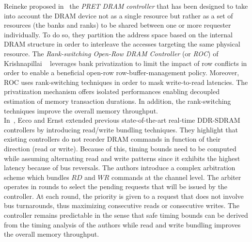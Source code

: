 \documentclass[main.tex]{subfiles}
\begin{document}
Reineke \etal proposed in~\cite{Reineke2011} the \emph{PRET DRAM controller} that has been designed to take into account the DRAM device not as a single resource but rather as a set of resources (the banks and ranks) to be shared between one or more requester individually. To do so, they partition the address space based on the internal DRAM structure in order to interleave the accesses targeting the same physical resource.
The \emph{Rank-switching Open-Row DRAM Controller} (or \emph{ROC}) of Krishnapillai \etal~\cite{Krishnapillai2014} leverages bank privatization to limit the impact of row conflicts in order to enable a beneficial open-row row-buffer-management policy. Moreover, ROC uses rank-switching techniques in order to mask write-to-read latencies. The privatization mechanism offers isolated performances enabling decoupled estimation of memory transaction durations. In addition, the rank-switching techniques improve the overall memory throughput.\\ 

In~\cite{Ecco2015}, Ecco and Ernst extended previous state-of-the-art real-time DDR-SDRAM controllers by introducing read/write bundling techniques. They highlight that existing controllers do not reorder DRAM commands in function of their direction (read or write). Because of this, timing bounds need to be computed while assuming alternating read and write patterns since it exhibits the highest latency because of bus reversals. The authors introduce a complex arbitration scheme which bundles $RD$ and $WR$ commands at the channel level. The arbiter operates in rounds to select the pending requests that will be issued by the controller. At each round, the priority is given to a request that does not involve bus turnarounds, thus maximizing consecutive reads or consecutive writes. The controller remains predictable in the sense that safe timing bounds can be derived from the timing analysis of the authors while read and write bundling improves the overall memory throughput.

\end{document}
